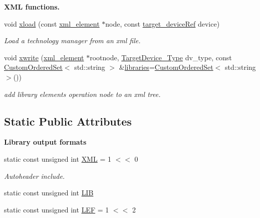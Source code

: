 \begin{Indent}\textbf{ X\+ML functions.}\par
\begin{DoxyCompactItemize}
\item 
void \hyperlink{classtechnology__manager_a3e17fc1041f0bb59220379c4c9ee0eb7}{xload} (const \hyperlink{classxml__element}{xml\+\_\+element} $\ast$node, const \hyperlink{target__device_8hpp_acedb2b7a617e27e6354a8049fee44eda}{target\+\_\+device\+Ref} device)
\begin{DoxyCompactList}\small\item\em Load a technology manager from an xml file. \end{DoxyCompactList}\item 
void \hyperlink{classtechnology__manager_acba7aabee7df6c10583d4fa5e1c52d73}{xwrite} (\hyperlink{classxml__element}{xml\+\_\+element} $\ast$rootnode, \hyperlink{target__device_8hpp_a476becc690220f0805ce73006449c732}{Target\+Device\+\_\+\+Type} dv\+\_\+type, const \hyperlink{classCustomOrderedSet}{Custom\+Ordered\+Set}$<$ std\+::string $>$ \&\hyperlink{classtechnology__manager_a3ca0b8fe373cdba4c0e7a92fe44b1380}{libraries}=\hyperlink{classCustomOrderedSet}{Custom\+Ordered\+Set}$<$ std\+::string $>$())
\begin{DoxyCompactList}\small\item\em add library elements operation node to an xml tree. \end{DoxyCompactList}\end{DoxyCompactItemize}
\end{Indent}
\subsection*{Static Public Attributes}
\begin{Indent}\textbf{ Library output formats}\par
\begin{DoxyCompactItemize}
\item 
static const unsigned int \hyperlink{classtechnology__manager_a8f97d158b7359918f01d1d7407710b53}{X\+ML} = 1 $<$$<$ 0
\begin{DoxyCompactList}\small\item\em Autoheader include. \end{DoxyCompactList}\item 
static const unsigned int \hyperlink{classtechnology__manager_a96f8db8f26d28892091b5320bfc239cd}{L\+IB}
\item 
static const unsigned int \hyperlink{classtechnology__manager_a95297bf9462e6c57d648a588b28220fd}{L\+EF} = 1 $<$$<$ 2
\end{DoxyCompactItemize}
\end{Indent}
